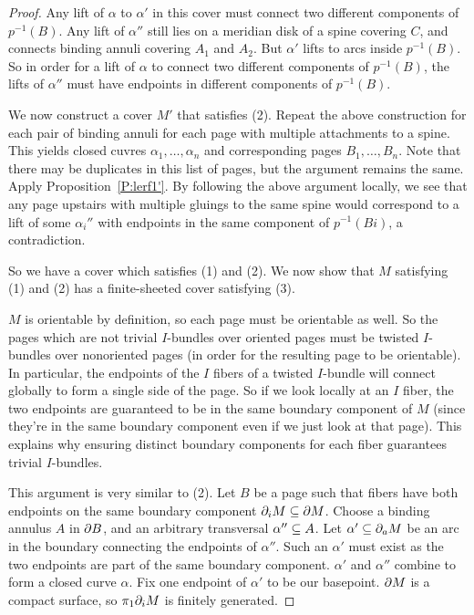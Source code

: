 \begin{proof}
Any lift of $\alpha$ to $\alpha'$ in this cover must connect two different
components of $p^{-1}(B)$.  Any lift of $\alpha''$ still lies on a meridian
disk of a spine covering $C$, and connects binding annuli covering $A_1$ and
$A_2$.  But $\alpha'$ lifts to arcs inside $p^{-1}(B)$. So in order for a lift
of $\alpha$ to connect two different components of $p^{-1}(B)$, the lifts of
$\alpha''$ must have endpoints in different components of $p^{-1}(B)$.

We now construct a cover $M'$ that satisfies (2). Repeat the above construction
for each pair of binding annuli for each page with multiple attachments to
a spine. This yields closed cuvres $\alpha_1,\dots,\alpha_n$ and corresponding
pages $B_1,\dots,B_n$. Note that there may be duplicates in this list of pages,
but the argument remains the same. Apply Proposition~\ref{P:lerf1'}. By
following the above argument locally, we see that any page upstairs with
multiple gluings to the same spine would correspond to a lift of some
$\alpha_i''$ with endpoints in the same component of $p^{-1}(Bi)$,
a contradiction.

So we have a cover which satisfies (1) and (2). We now show that $M$ satisfying
(1) and (2) has a finite-sheeted cover satisfying (3).

$M$ is orientable by definition, so each page must be orientable as well. So
the pages which are not trivial $I$-bundles over oriented pages must be twisted
$I$-bundles over nonoriented pages (in order for the resulting page to be
orientable). In particular, the endpoints of the $I$ fibers of a twisted
$I$-bundle will connect globally to form a single side of the page. So if we
look locally at an $I$ fiber, the two endpoints are guaranteed to be in the
same boundary component of $M$ (since they're in the same boundary component
even if we just look at that page). This explains why ensuring distinct
boundary components for each fiber guarantees trivial $I$-bundles.

This argument is very similar to (2). Let $B$ be a page such that fibers have
both endpoints on the same boundary component $\partial_i M \subseteq \partial M$.  Choose
a binding annulus $A$ in $\partial B$, and an arbitrary transversal $\alpha'' \subseteq
A$.  Let $\alpha' \subseteq \partial_a M$ be an arc in the boundary connecting the
endpoints of $\alpha''$. Such an $\alpha'$ must exist as the two endpoints are
part of the same boundary component. $\alpha'$ and $\alpha''$ combine to form
a closed curve $\alpha$.  Fix one endpoint of $\alpha'$ to be our basepoint.
$\partial M$ is a compact surface, so $\pi_1 \partial_i M$ is finitely generated.


\end{proof}
